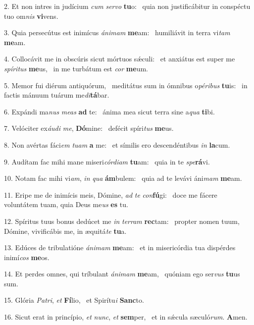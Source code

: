 2. Et non intres in judícium \textit{cum} \textit{ser}\textit{vo} \textbf{tu}o: \ast\  quia non justificábitur in conspéctu tuo om\textit{nis} \textbf{vi}vens.\

3. Quia persecútus est inimícus \textit{á}\textit{ni}\textit{mam} \textbf{me}am: \ast\  humiliávit in terra vi\textit{tam} \textbf{me}am.\

4. Collocávit me in obscúris sicut mórtuos sǽculi: \dag\  et anxiátus est super me \textit{spí}\textit{ri}\textit{tus} \textbf{me}us, \ast\  in me turbátum est \textit{cor} \textbf{me}um.\

5. Memor fui diérum antiquórum, \dag\  meditátus sum in ómnibus o\textit{pé}\textit{ri}\textit{bus} \textbf{tu}is: \ast\  in factis mánuum tuárum me\textit{di}\textbf{tá}bar.\

6. Expándi ma\textit{nus} \textit{me}\textit{as} \textbf{ad} te: \ast\  ánima mea sicut terra sine a\textit{qua} \textbf{ti}bi.\

7. Velóciter ex\textit{áu}\textit{di} \textit{me}, \textbf{Dó}mine: \ast\  defécit spíri\textit{tus} \textbf{me}us.\

8. Non avértas fáci\textit{em} \textit{tu}\textit{am} \textbf{a} me: \ast\  et símilis ero descendéntibus \textit{in} \textbf{la}cum.\

9. Audítam fac mihi mane miseri\textit{cór}\textit{di}\textit{am} \textbf{tu}am: \ast\  quia in te \textit{spe}\textbf{rá}vi.\

10. Notam fac mihi vi\textit{am}, \textit{in} \textit{qua} \textbf{ám}bulem: \ast\  quia ad te levávi áni\textit{mam} \textbf{me}am.\

11. Eripe me de inimícis meis, Dómine, \textit{ad} \textit{te} \textit{con}\textbf{fú}gi: \ast\  doce me fácere voluntátem tuam, quia Deus me\textit{us} \textbf{es} tu.\

12. Spíritus tuus bonus dedúcet me \textit{in} \textit{ter}\textit{ram} \textbf{rec}tam: \ast\  propter nomen tuum, Dómine, vivificábis me, in æquitá\textit{te} \textbf{tu}a.\

13. Edúces de tribulatióne \textit{á}\textit{ni}\textit{mam} \textbf{me}am: \ast\  et in misericórdia tua dispérdes inimí\textit{cos} \textbf{me}os.\

14. Et perdes omnes, qui tríbulant \textit{á}\textit{ni}\textit{mam} \textbf{me}am, \ast\  quóniam ego ser\textit{vus} \textbf{tu}us sum.\

15. Glória \textit{Pa}\textit{tri}, \textit{et} \textbf{Fí}lio, \ast\  et Spirítu\textit{i} \textbf{Sanc}to.\

16. Sicut erat in princípio, \textit{et} \textit{nunc}, \textit{et} \textbf{sem}per, \ast\  et in sǽcula sæculó\textit{rum}. \textbf{A}men.\

